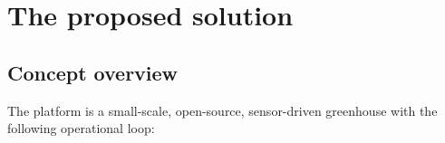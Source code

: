 %
%
\section{The proposed solution}\label{sec:solution}

\subsection{Concept overview}

The platform is a small-scale, open-source, sensor-driven greenhouse with the following operational loop:

